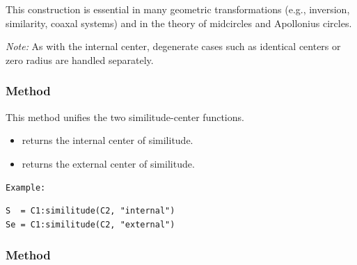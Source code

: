\medskip

This construction is essential in many geometric transformations (e.g., inversion, similarity, coaxal systems) and in the theory of midcircles and Apollonius circles.

\medskip

\emph{Note:} As with the internal center, degenerate cases such as identical centers or zero radius are handled separately.

\vspace{1em}

\begin{tkzexample}[latex=.5\textwidth]
\begin{center}
\end{center}
\end{tkzexample}

\subsubsection{Method }
\label{ssub:similitude}

This method unifies the two similitude-center functions.

\begin{itemize}
  \item {} returns the internal center of similitude.
  \item {} returns the external center of similitude.
\end{itemize}

\medskip
\noindent\texttt{Example: }
\begin{verbatim}
S  = C1:similitude(C2, "internal")
Se = C1:similitude(C2, "external")
\end{verbatim}


\subsubsection{Method }
\label{ssub:radical_center}

